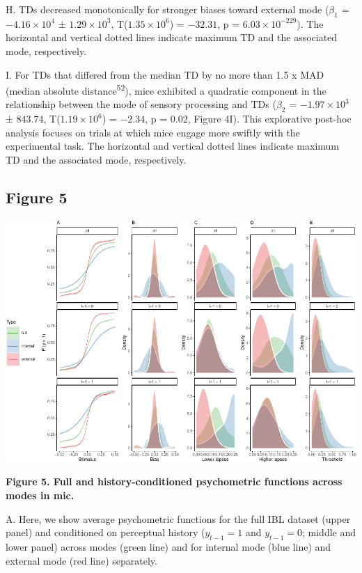 \documentclass[
]{article}
\begin{document}
H. TDs decreased monotonically for stronger biases toward external mode
(\(\beta_1\) = \(\ensuremath{-4.16\times 10^{4}}\) ±
\(\ensuremath{1.29\times 10^{3}}\),
T(\(\ensuremath{1.35\times 10^{6}}\)) = \(-32.31\), p =
\(\ensuremath{6.03\times 10^{-229}}\)). The horizontal and vertical
dotted lines indicate maximum TD and the associated mode, respectively.

I. For TDs that differed from the median TD by no more than 1.5 x MAD
(median absolute distance\textsuperscript{52}), mice exhibited a
quadratic component in the relationship between the mode of sensory
processing and TDs (\(\beta_2\) = \(\ensuremath{-1.97\times 10^{3}}\) ±
\(843.74\), T(\(\ensuremath{1.19\times 10^{6}}\)) = \(-2.34\), p =
\(0.02\), Figure 4I). This explorative post-hoc analysis focuses on
trials at which mice engage more swiftly with the experimental task. The
horizontal and vertical dotted lines indicate maximum TD and the
associated mode, respectively.

\newpage

\hypertarget{figure-5}{%
\subsection{Figure 5}\label{figure-5}}

\includegraphics{modes_mouse_files/figure-latex/Figure_5-1.pdf}

\textbf{Figure 5. Full and history-conditioned psychometric functions
across modes in mic.}

A. Here, we show average psychometric functions for the full IBL dataset
(upper panel) and conditioned on perceptual history (\(y_{t-1} = 1\) and
\(y_{t-1} = 0\); middle and lower panel) across modes (green line) and
for internal mode (blue line) and external mode (red line) separately.
\end{document}
